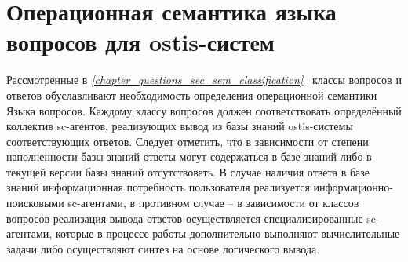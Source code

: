 \section{Операционная семантика языка вопросов для ostis-систем}
\label{sec_requests_op_semantics}

Рассмотренные в \textit{\ref{chapter_questions_sec_sem_classification}~} классы вопросов и ответов обуславливают необходимость определения операционной семантики Языка вопросов. Каждому классу вопросов должен соответствовать определённый коллектив sc-агентов, реализующих вывод из базы знаний ostis-системы соответствующих ответов. Следует отметить, что в зависимости от степени наполненности базы знаний ответы могут содержаться в базе знаний либо в текущей версии базы знаний отсутствовать. В случае наличия ответа в базе знаний информационная потребность пользователя реализуется информационно-поисковыми sc-агентами, в противном случае -- в зависимости от классов вопросов реализация вывода ответов осуществляется специализированные sc-агентами, которые в процессе работы дополнительно выполняют вычислительные задачи либо осуществляют синтез на основе логического вывода.

